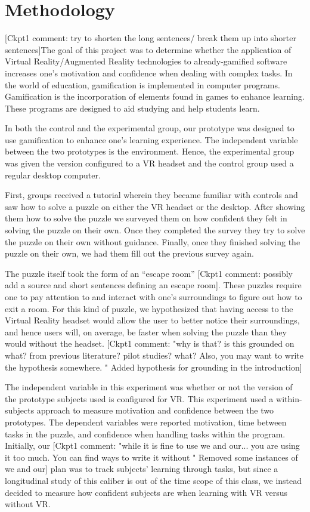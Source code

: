 \documentclass[manuscript,screen,review]{acmart}
\begin{document}
\section{Methodology}
[Ckpt1 comment: try to shorten the long sentences/ break them up into shorter sentences]The goal of this project was to determine whether the application of Virtual Reality/Augmented Reality technologies to already-gamified software increases one’s motivation and confidence when dealing with complex tasks. In the world of education, gamification is implemented in computer programs. Gamification is the incorporation of elements found in games to enhance learning. These programs are designed to aid studying and help students learn.  \cite{oberdorfer2021mutual} 

In both the control and the experimental group, our prototype was designed to use gamification to enhance one’s learning experience. The independent variable between the two prototypes is the environment. Hence, the experimental group was given the version configured to a VR headset and the control group used a regular desktop computer. 

First, groups received a tutorial wherein they became familiar with controls and saw how to solve a puzzle on either the VR headset or the desktop. After showing them how to solve the puzzle we surveyed them on how confident they felt in solving the puzzle on their own. Once they completed the survey they try to solve the puzzle on their own without guidance. Finally, once they finished solving the puzzle on their own, we had them fill out the previous survey again.

The puzzle itself took the form of an “escape room” [Ckpt1 comment: possibly add a source and short sentences defining an escape room]. These puzzles require one to pay attention to and interact with one’s surroundings to figure out how to exit a room. For this kind of puzzle, we hypothesized that having access to the Virtual Reality headset would allow the user to better notice their surroundings, and hence users will, on average, be faster when solving the puzzle than they would without the headset. [Ckpt1 comment: "why is that? is this grounded on what?  from previous literature? pilot studies? what? Also, you may want to write the hypothesis somewhere. " Added hypothesis for grounding in the introduction]

The independent variable in this experiment was whether or not the version of the prototype subjects used is configured for VR. This experiment used a within-subjects approach to measure motivation and confidence between the two prototypes. The dependent variables were reported motivation, time between tasks in the puzzle, and confidence when handling tasks within the program. Initially, our [Ckpt1 comment: "while it is fine to use we and our... you are using it too much. You can find ways to write it without " Removed some instances of we and our] plan was to track subjects’ learning through tasks, but since a longitudinal study of this caliber is out of the time scope of this class, we instead decided to measure how confident subjects are when learning with VR versus without VR.
\end{document}
